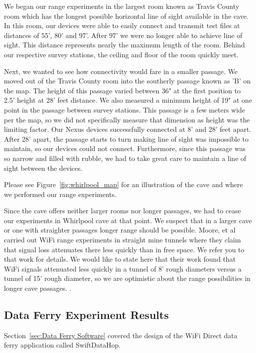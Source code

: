 \documentclass[10pt,twocolumn]{article}
\begin{document}
We began our range experiments in the largest room known as Travis County room which has the longest possible horizontal line of sight available in the cave.
In this room, our devices were able to easily connect and transmit test files at distances of 55', 80' and 97'. 
After 97' we were no longer able to achieve line of sight.
This distance represents nearly the maximum length of the room. 
Behind our respective survey stations, the ceiling and floor of the room quickly meet.

Next, we wanted to see how connectivity would fare in a smaller passage. 
We moved out of the Travis County room into the southerly passage known as 'B' on the map.
The height of this passage varied between 36" at the first position to 2.5' height at 28' feet distance.
We also measured a minimum height of 19" at one point in the passage between survey stations.
This passage is a few meters wide per the map, so we did not specifically measure that dimension as height was the limiting factor.
Our Nexus devices successfully connected at 8' and 28' feet apart.
After 28' apart, the passage starts to turn making line of sight was impossible to maintain, so our devices could not connect.
Furthermore, since this passage was so narrow and filled with rubble, we had to take great care to maintain a line of sight between the devices.

Please see Figure~\ref{fig:whirlpool_map} for an illustration of the cave and where we performed our range experiments.

Since the cave offers neither larger rooms nor longer passages, we had to cease our experiments in Whirlpool cave at that point.
We suspect that in a larger cave or one with straighter passages longer range should be possible.
Moore, et al carried out WiFi range experiments in straight mine tunnels where they claim that signal loss attenuates there less quickly than in free space.
We refer you to that work for details.
We would like to state here that their work found that WiFi signals attenuated less quickly in a tunnel of 8' rough diameters versus a tunnel of 15' rough diameter, so we are optimistic about the range possibilities in longer cave passages. \cite{moore2012}.

\subsection{Data Ferry Experiment Results}
Section~\ref{sec:Data Ferry Software} covered the design of the WiFi Direct data ferry application called SwiftDataHop. 
\end{document}
